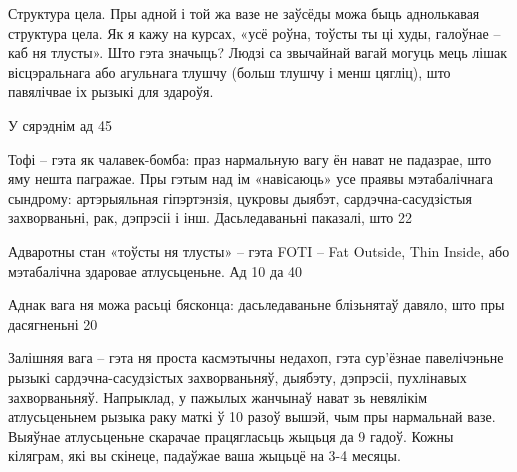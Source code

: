 Структура цела. Пры адной і той жа вазе не заўсёды можа быць аднолькавая структура цела. Як я кажу на курсах, «усё роўна, тоўсты ты ці худы, галоўнае – каб ня тлусты». Што гэта значыць? Людзі са звычайнай вагай могуць мець лішак вісцэральнага або агульнага тлушчу (больш тлушчу і менш цягліц), што павялічвае іх рызыкі для здароўя.

У сярэднім ад 45%

Тофі – гэта як чалавек-бомба: праз нармальную вагу ён нават не падазрае, што яму нешта пагражае. Пры гэтым над ім «навісаюць» усе праявы мэтабалічнага сындрому: артэрыяльная гіпэртэнзія, цукровы дыябэт, сардэчна-сасудзістыя захворваньні, рак, дэпрэсіі і інш. Дасьледаваньні паказалі, што 22%

Адваротны стан «тоўсты ня тлусты» – гэта FOTI – Fat Outside, Thin Inside, або мэтабалічна здаровае атлусьценьне. Ад 10 да 40%

Аднак вага ня можа расьці бясконца: дасьледаваньне блізьнятаў давяло, што пры дасягненьні 20%

Залішняя вага – гэта ня проста касмэтычны недахоп, гэта сур'ёзнае павелічэньне рызыкі сардэчна-сасудзістых захворваньняў, дыябэту, дэпрэсіі, пухлінавых захворваньняў. Напрыклад, у пажылых жанчынаў нават зь невялікім атлусьценьнем рызыка раку маткі ў 10 разоў вышэй, чым пры нармальнай вазе. Выяўнае атлусьценьне скарачае працягласьць жыцьця да 9 гадоў. Кожны кіляграм, які вы скінеце, падаўжае ваша жыцьцё на 3-4 месяцы.

